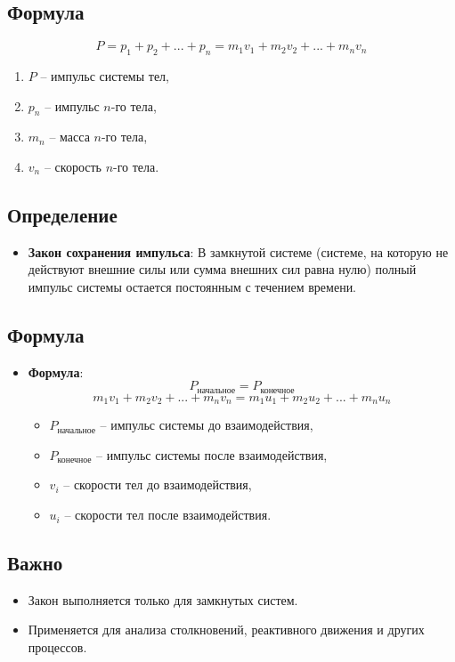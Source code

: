 \documentclass[a4paper,12pt]{article}
\begin{document}
\vspace{-9pt}
\subsection*{Формула}
\vspace{-3pt}
\[ P = p_1 + p_2 + ... + p_n = m_1v_1 + m_2v_2 + ... + m_nv_n \]
\begin{enumerate}[itemsep=0pt, topsep=0pt, parsep=3pt]
  \item $P$ – импульс системы тел,
  \item $p_n$ – импульс $n$-го тела,
  \item $m_n$ – масса $n$-го тела,
  \item $v_n$ – скорость $n$-го тела.
\end{enumerate}


\vspace{-9pt}
\subsection*{Определение}
\vspace{-3pt}
\begin{itemize}[itemsep=0pt, topsep=0pt, parsep=3pt]
  \item \textbf{Закон сохранения импульса}: В замкнутой системе (системе, на которую не действуют внешние силы или сумма внешних сил равна нулю) полный импульс системы остается постоянным с течением времени.
\end{itemize}

\vspace{-9pt}
\subsection*{Формула}
\vspace{-3pt}
\begin{itemize}[itemsep=0pt, topsep=0pt, parsep=3pt]
  \item \textbf{Формула}: \[ P_{\text{начальное}} = P_{\text{конечное}} \] \[ m_1v_1 + m_2v_2 + ... + m_nv_n = m_1u_1 + m_2u_2 + ... + m_nu_n \]
    \begin{itemize}[itemsep=0pt, topsep=0pt, parsep=3pt]
      \item $P_{\text{начальное}}$ – импульс системы до взаимодействия,
      \item $P_{\text{конечное}}$ – импульс системы после взаимодействия,
      \item $v_i$ – скорости тел до взаимодействия,
      \item $u_i$ – скорости тел после взаимодействия.
    \end{itemize}
\end{itemize}

\vspace{-9pt}
\subsection*{Важно}
\vspace{-3pt}
\begin{itemize}[itemsep=0pt, topsep=0pt, parsep=3pt]
  \item Закон выполняется только для замкнутых систем.
  \item Применяется для анализа столкновений, реактивного движения и других процессов.
\end{itemize}
\end{document}
